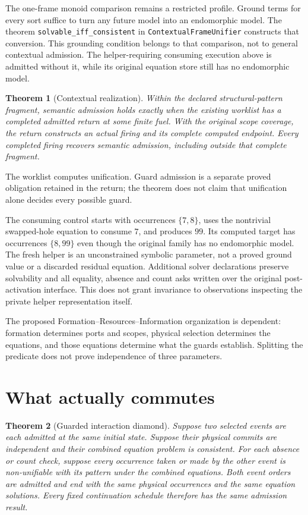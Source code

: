 \documentclass[11pt]{article}
\newtheorem{theorem}{Theorem}
\newcommand{\code}[1]{\texttt{\small #1}}
\begin{document}
The one-frame monoid comparison remains a restricted profile. Ground terms
for every sort suffice to turn any future model into an endomorphic model.
The theorem \code{solvable\_iff\_consistent} in
\code{ContextualFrameUnifier} constructs that conversion.
This grounding condition belongs to that comparison, not to
general contextual admission. The helper-requiring consuming execution
above is admitted without it, while its original equation store still has
no endomorphic model.

\begin{theorem}[Contextual realization]
Within the declared structural-pattern fragment, semantic admission holds
exactly when the existing worklist has a completed admitted return at some
finite fuel. With the original scope coverage, the return constructs an
actual firing and its complete computed endpoint. Every completed firing
recovers semantic admission, including outside that complete fragment.
\end{theorem}

The worklist computes unification. Guard admission is a separate proved
obligation retained in the return; the theorem does not claim that
unification alone decides every possible guard.

The consuming control starts with occurrences $\{7,8\}$, uses the
nontrivial swapped-hole equation to consume $7$, and produces $99$.
Its computed target has occurrences $\{8,99\}$ even though the original
family has no endomorphic model. The fresh helper is an unconstrained
symbolic parameter, not a proved ground value or a discarded residual
equation. Additional solver declarations preserve solvability and all
equality, absence and count asks written over the original post-activation
interface. This does not grant invariance to observations inspecting the
private helper representation itself.

The proposed Formation--Resources--Information organization is dependent:
formation determines ports and scopes, physical selection determines the
equations, and those equations determine what the guards establish.
Splitting the predicate does not prove independence of three parameters.

\section{What actually commutes}

\begin{theorem}[Guarded interaction diamond]
Suppose two selected events are each admitted at the same initial state.
Suppose their physical commits are independent and their combined equation
problem is consistent. For each absence or count check, suppose every
occurrence taken or made by the other event is non-unifiable with its
pattern under the combined equations. Both event orders are admitted and
end with the same physical occurrences and the same equation solutions.
Every fixed continuation schedule therefore has the same admission result.
\end{theorem}
\end{document}
